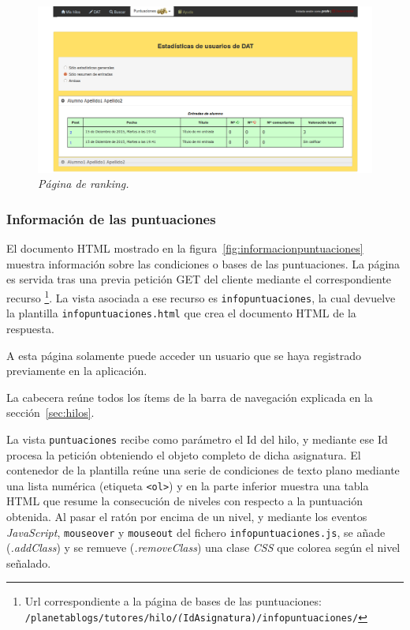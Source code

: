 \documentclass[a4paper, 12pt]{book}
\begin{document}
\begin{figure}
  \centering
  \includegraphics[width=17cm, keepaspectratio]{imagenes/HiloAlumnoEstadisticas}
  \caption{\textit{P\'agina de ranking.}}
  \label{fig:estadisticas}
\end{figure}


\subsubsection{Informaci\'on de las puntuaciones} 
\label{sec:informacionpuntuaciones}
El documento HTML mostrado en la figura~\ref{fig:informacionpuntuaciones} muestra informaci\'on sobre las condiciones o bases de las puntuaciones. 
La p\'agina es servida tras una previa petici\'on GET del cliente mediante el correspondiente recurso \footnote{Url correspondiente a la p\'agina de 
bases de las puntuaciones:\\ \texttt{/planetablogs/tutores/hilo/\textit(IdAsignatura)/infopuntuaciones/}}. La vista asociada a ese recurso es 
\texttt{infopuntuaciones}, la cual devuelve la plantilla \texttt{infopuntuaciones.html} que crea el documento HTML de la respuesta.

A esta p\'agina solamente puede acceder un usuario que se haya registrado previamente en la aplicaci\'on.

La cabecera re\'une todos los \'items de la barra de navegaci\'on explicada en la secci\'on~\ref{sec:hilos}.

La vista \texttt{puntuaciones} recibe como par\'ametro el Id del hilo, y mediante ese Id procesa la petici\'on obteniendo el objeto completo de dicha 
asignatura. El contenedor de la plantilla re\'une una serie de condiciones de texto plano mediante una lista num\'erica (etiqueta \texttt{<ol>}) y 
en la parte inferior muestra una tabla HTML que resume la consecuci\'on de niveles con respecto a la puntuaci\'on obtenida. Al pasar el rat\'on por encima 
de un nivel, y mediante los eventos \textit{JavaScript}, \texttt{mouseover} y \texttt{mouseout} del fichero \texttt{infopuntuaciones.js}, se a\~nade 
(\textit{.addClass}) y se remueve (\textit{.removeClass}) una clase \textit{CSS} que colorea seg\'un el nivel se\~nalado.
\end{document}
